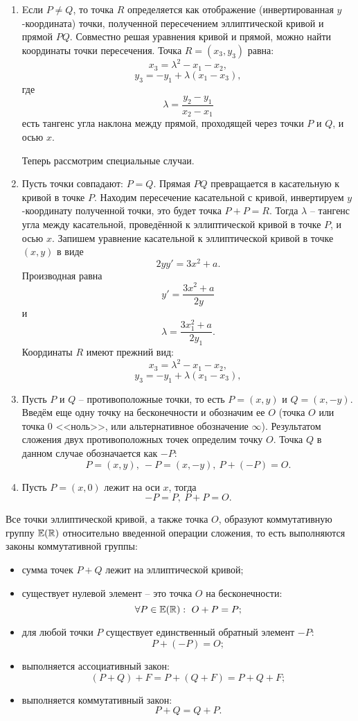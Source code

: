 \begin{enumerate}
    \item Eсли $P \neq Q$, то точка $R$ определяется как отображение (инвертированная $y$-координата) точки, полученной пересечением эллиптической кривой и прямой $PQ$. Совместно решая уравнения кривой и прямой, можно найти координаты точки пересечения. Точка $R = (x_3, y_3)$ равна:
        \[ x_3 = \lambda^2 - x_1 - x_2, \]
        \[ y_3 = - y_1 + \lambda (x_1 - x_3), \]
        где
        \[ \lambda = \frac{y_2 - y_1}{x_2 - x_1} \]
        есть тангенс угла наклона между прямой, проходящей через точки $P$ и $Q$, и осью $x$.

        Теперь рассмотрим специальные случаи.
    \item Пусть точки совпадают: $P = Q$. Прямая $PQ$ превращается в касательную к кривой в точке $P$. Находим пересечение касательной с кривой, инвертируем $y$-координату полученной точки, это будет точка $P + P = R$. Тогда $\lambda$ -- тангенс угла между касательной, проведённой к эллиптической кривой в точке $P$, и осью $x$. Запишем уравнение касательной к эллиптической кривой в точке $(x,y)$ в виде
            \[ 2 y y' = 3 x^2 + a. \]
        Производная равна
            \[ y' = \frac{3 x^2 + a}{2 y} \]
        и
            \[ \lambda = \frac{3 x_1^2 + a}{2 y_1}. \]
        Координаты $R$ имеют прежний вид:
            \[ x_3 = \lambda^2 - x_1 - x_2, \]
            \[ y_3 = - y_1 + \lambda (x_1 - x_3), \]
    \item Пусть $P$ и $Q$ -- противоположные точки, то есть $P=(x,y)$ и $Q=(x, -y)$. Введём еще одну точку на бесконечности и обозначим ее $O$ (точка $O$ или точка 0 <<ноль>>, или альтернативное обозначение $\infty$). Результатом сложения двух противоположных точек определим точку $O$. Точка $Q$ в данном случае обозначается как $-P$:
        \[ P = (x,y), ~ -P = (x, -y), ~ P + (-P) = O. \]
    \item Пусть $P = (x, 0)$ лежит на оси $x$, тогда
        \[ -P = P, ~ P + P = O. \]
\end{enumerate}

Все точки эллиптической кривой, а также точка $O$, образуют коммутативную группу $\mathbb{E}(\mathbb{R})$ относительно введенной операции сложения, то есть выполняются законы коммутативной группы:
\begin{itemize}
    \item сумма точек $P + Q$ лежит на эллиптической кривой;
    \item существует нулевой элемент -- это точка $O$ на бесконечности:
        \[ \forall P \in \mathbb{E}(\mathbb{R}): ~ O + P = P; \]
    \item для любой точки $P$ существует единственный обратный элемент $-P$:
        \[ P + (-P) = O; \]
    \item выполняется ассоциативный закон:
        \[ (P + Q) + F = P + (Q + F) = P + Q + F; \]
    \item выполняется коммутативный закон:
        \[ P + Q = Q + P. \]
\end{itemize}

